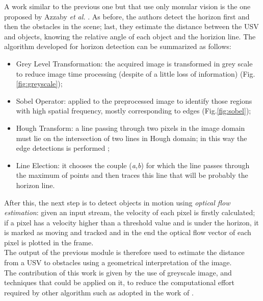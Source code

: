 \documentclass[12pt]{article}
\begin{document}
      \indent A work similar to the previous one but that use only monular vision is the one proposed by Azzaby \textit{et al.} \parencite{Azzabi}. As before, the authors detect the horizon first and then the obstacles in the scene; last, they estimate the distance between the USV and objects, knowing the relative angle of each object and the horizion line. The algorithm developed for horizon detection can be summarized as follows:
            \begin{itemize}
                  \item Grey Level Transformation: the acquired image is transformed in grey scale to reduce image time processing (despite of a little loss of information) (Fig.\ref{fig:greyscale});
                  \item Sobel Operator: applied to the preprocessed image to identify those regions with high spatial frequency, mostly corresponding to edges \parencite{Maini2009} (Fig.\ref{fig:sobel});
                  \item Hough Transform: a line passing through two pixels in the image domain must lie on the intersection of two lines in Hough domain; in this way the edge detections is performed \parencite{Hough_1962};
                  \item Line Election: it chooses the couple (\textit{a,b}) for which the line passes through the maximum of points and then traces this line that will be probably the horizon line.
            \end{itemize}
      \indent After this, the next step is to detect objects in motion using \textit{optical flow estimation}: given an input stream, the velocity of each pixel is firstly calculated; if a pixel has a velocity higher than a threshold value and is under the horizon, it is marked as moving and tracked and in the end the optical flow vector of each pixel is plotted in the frame.\\
      \indent The output of the previous module is therefore used to estimate the distance from a USV to obstacles using a geometrical interpretation of the image.\\
      The contribution of this work is given by the use of greyscale image, and techniques that could be applied on it, to reduce the computational effort required by other algorithm such as \parencite{Ettinger2003} adopted in the work of \textcite{Larson2007a}.
\end{document}

